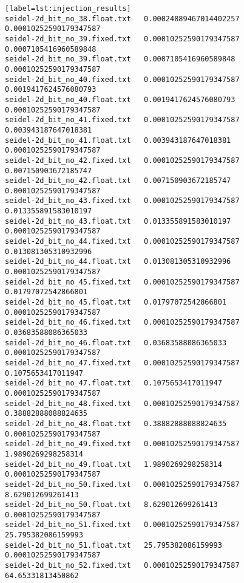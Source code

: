 \begin{verbatim}[label=lst:injection_results]
seidel-2d_bit_no_38.float.txt   0.00024889467014402257                  0.00010252590179347587
seidel-2d_bit_no_39.fixed.txt   0.00010252590179347587                  0.0007105416960589848
seidel-2d_bit_no_39.float.txt   0.0007105416960589848                   0.00010252590179347587
seidel-2d_bit_no_40.fixed.txt   0.00010252590179347587                  0.0019417624576080793
seidel-2d_bit_no_40.float.txt   0.0019417624576080793                   0.00010252590179347587
seidel-2d_bit_no_41.fixed.txt   0.00010252590179347587                  0.003943187647018381
seidel-2d_bit_no_41.float.txt   0.003943187647018381                    0.00010252590179347587
seidel-2d_bit_no_42.fixed.txt   0.00010252590179347587                  0.007150903672185747
seidel-2d_bit_no_42.float.txt   0.007150903672185747                    0.00010252590179347587
seidel-2d_bit_no_43.fixed.txt   0.00010252590179347587                  0.013355891583010197
seidel-2d_bit_no_43.float.txt   0.013355891583010197                    0.00010252590179347587
seidel-2d_bit_no_44.fixed.txt   0.00010252590179347587                  0.013081305310932996
seidel-2d_bit_no_44.float.txt   0.013081305310932996                    0.00010252590179347587
seidel-2d_bit_no_45.fixed.txt   0.00010252590179347587                  0.01797072542866801
seidel-2d_bit_no_45.float.txt   0.01797072542866801                     0.00010252590179347587
seidel-2d_bit_no_46.fixed.txt   0.00010252590179347587                  0.03683588086365033
seidel-2d_bit_no_46.float.txt   0.03683588086365033                     0.00010252590179347587
seidel-2d_bit_no_47.fixed.txt   0.00010252590179347587                  0.1075653417011947
seidel-2d_bit_no_47.float.txt   0.1075653417011947                      0.00010252590179347587
seidel-2d_bit_no_48.fixed.txt   0.00010252590179347587                  0.38882888088824635
seidel-2d_bit_no_48.float.txt   0.38882888088824635                     0.00010252590179347587
seidel-2d_bit_no_49.fixed.txt   0.00010252590179347587                  1.9890269298258314
seidel-2d_bit_no_49.float.txt   1.9890269298258314                      0.00010252590179347587
seidel-2d_bit_no_50.fixed.txt   0.00010252590179347587                  8.629012699261413
seidel-2d_bit_no_50.float.txt   8.629012699261413                       0.00010252590179347587
seidel-2d_bit_no_51.fixed.txt   0.00010252590179347587                  25.795382086159993
seidel-2d_bit_no_51.float.txt   25.795382086159993                      0.00010252590179347587
seidel-2d_bit_no_52.fixed.txt   0.00010252590179347587                  64.65331813450862

\end{verbatim}

